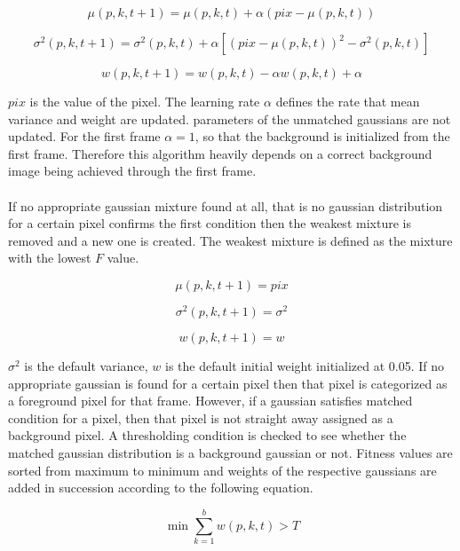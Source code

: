 \documentclass[12pt,a4paper]{report}
\begin{document}
\begin{equation}
 \mu(p,k,t+1)=  \mu(p,k,t)+ \alpha(pix- \mu(p,k,t))  
\end{equation}

\begin{equation}
\sigma^2(p,k,t+1)= \sigma^2(p,k,t)+\alpha[(pix- \mu(p,k,t))^2-\sigma^2(p,k,t)]
\end{equation}

\begin{equation}
 w(p,k,t+1)=  w(p,k,t)- \alpha w(p,k,t)+\alpha
\end{equation}

$pix$ is the value of the pixel. The learning rate $\alpha$ defines the rate that mean variance and weight are updated. parameters of the unmatched gaussians are not updated. For the first frame $\alpha = 1$, so that the background is initialized from the first frame.  Therefore this algorithm heavily depends on a correct background image being achieved through the first frame.\\\\
If no appropriate gaussian mixture found at all, that is no gaussian distribution for a certain pixel confirms the first condition then the weakest mixture is removed and a new one is created. The weakest mixture is defined as the mixture with the lowest $F$ value.

\begin{equation}
 \mu(p,k,t+1)=  pix
\end{equation}

\begin{equation}
\sigma^2(p,k,t+1)= \sigma^2
\end{equation}

\begin{equation}
 w(p,k,t+1)=w
\end{equation}

$\sigma^2$  is the default variance, $w$ is the default initial weight initialized at 0.05. If no appropriate gaussian is found for a certain pixel then that pixel is categorized as a foreground pixel for that frame. However, if a gaussian satisfies matched condition for a pixel, then that pixel is not straight away assigned as a background pixel. A thresholding condition is checked to see whether the matched gaussian distribution is a background gaussian or not. Fitness values are sorted from maximum to minimum and weights of the respective gaussians are added in succession according to the following equation.

\begin{equation}
\min \sum_{k=1}^{b} w(p,k,t)>T
\end{equation}
\end{document}
